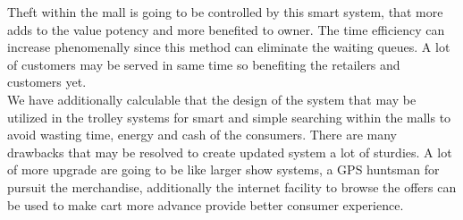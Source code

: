 \documentclass[12pt]{article}
\begin{document}
\hspace*{1 cm}Theft within the mall is going to be controlled by this smart system, that more adds to the value potency and more benefited to owner. The time efficiency can increase phenomenally since this method can eliminate the waiting queues. A lot of customers may be served in same time so benefiting the retailers and customers yet.\\
\hspace*{1 cm}We have additionally calculable that the design of the system that may be utilized in the trolley systems for smart and simple searching within the malls to avoid wasting time, energy and cash of the consumers. There are many drawbacks that may be resolved to create updated system a lot of sturdies. A lot of more upgrade are going to be like larger show systems, a GPS huntsman for pursuit the merchandise, additionally the internet facility to browse the offers can be used to make cart more advance provide better consumer experience.
\end{document}
